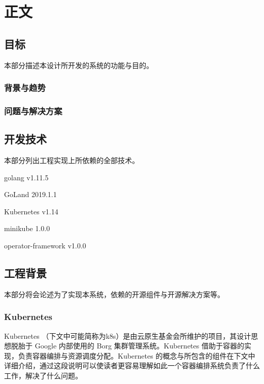 
\newcommand{\paragraphnl}[1]{\paragraph{#1}\hspace{0pt}\\}

\section{正文}

\subsection{目标}

本部分描述本设计所开发的系统的功能与目的。

\subsubsection{背景与趋势}

\subsubsection{问题与解决方案}

\subsection{开发技术}

本部分列出工程实现上所依赖的全部技术。

golang v1.11.5

GoLand 2019.1.1

Kubernetes v1.14

minikube 1.0.0

operator-framework v1.0.0

\subsection{工程背景}

本部分将会论述为了实现本系统，依赖的开源组件与开源解决方案等。

\subsubsection{Kubernetes}

Kubernetes （下文中可能简称为k8s）是由云原生基金会所维护的项目，其设计思想脱胎于 Google 内部使用的 Borg 集群管理系统。Kubernetes 借助于容器的实现，负责容器编排与资源调度分配。Kubernetes 的概念与所包含的组件在下文中详细介绍，通过这段说明可以使读者更容易理解如此一个容器编排系统负责了什么工作，解决了什么问题。

